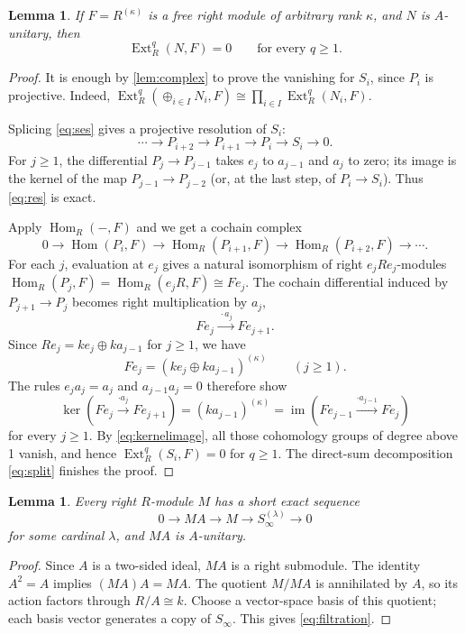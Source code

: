 \documentclass[11pt]{amsart}
\newtheorem{lemma}[theorem]{Lemma}
\theoremstyle{definition}
\theoremstyle{remark}
\newcommand{\Ext}{\operatorname{Ext}}
\newcommand{\Hom}{\operatorname{Hom}}
\begin{document}
\begin{lemma}\label{lem:Extvanish}
If $F=R^{(\kappa)}$ is a free right module of arbitrary rank $\kappa$, and $N$ is $A$-unitary, then
\begin{equation}\label{eq:Extvanish}
\Ext_R^q(N,F)=0\qquad\text{for every }q\geq1.
\end{equation}
\end{lemma}
\begin{proof}
It is enough by \cref{lem:complex} to prove the vanishing for $S_i$, since $P_i$ is projective. Indeed, $\Ext^q_R(\oplus_{i\in I}N_i,F)\cong\prod_{i\in I}\Ext_R^q(N_i,F)$.

Splicing \eqref{eq:ses} gives a projective resolution of $S_i$:
\begin{equation}\label{eq:res}
\cdots\longrightarrow P_{i+2}\longrightarrow P_{i+1}
\longrightarrow P_i\longrightarrow S_i\longrightarrow0.
\end{equation}
For $j\geq1$, the differential $P_j\to P_{j-1}$ takes $e_j$ to $a_{j-1}$ and $a_j$ to zero; its image is the kernel of the map $P_{j-1}\to P_{j-2}$ (or, at the last step, of $P_i\to S_i$). Thus \eqref{eq:res} is exact.

Apply $\Hom_R(-,F)$ and we get a cochain complex\[
0\longrightarrow \Hom(P_i,F)\longrightarrow\Hom_R(P_{i+1},F)\longrightarrow\Hom_R(P_{i+2},F)\longrightarrow\cdots.
\]
For each $j$, evaluation at $e_j$ gives a natural isomorphism of right $e_jRe_j$-modules $\Hom_R(P_j,F)=\Hom_R(e_jR,F)\cong Fe_j$. The cochain differential induced by $P_{j+1}\to P_j$ becomes right multiplication by $a_j$,
\[
Fe_j\xrightarrow{\,\cdot a_j\,}Fe_{j+1}.
\]
Since $Re_j=ke_j\oplus ka_{j-1}$ for $j\geq1$, we have
\[
Fe_j=(ke_j\oplus ka_{j-1})^{(\kappa)}\qquad(j\geq1).
\]
The rules $e_ja_j=a_j$ and $a_{j-1}a_j=0$ therefore show
\begin{equation}\label{eq:kernelimage}
\ker(Fe_j\xrightarrow{\cdot a_j}Fe_{j+1})
=(ka_{j-1})^{(\kappa)}
=\operatorname{im}(Fe_{j-1}\xrightarrow{\cdot a_{j-1}}Fe_j)
\end{equation}
for every $j\geq1$. By \eqref{eq:kernelimage}, all those cohomology groups of degree above 1 vanish, and hence $\Ext_R^q(S_i,F)=0$ for $q\geq1$. The direct-sum decomposition \eqref{eq:split} finishes the proof.
\end{proof}

\begin{lemma}\label{lem:filtration}
Every right $R$-module $M$ has a short exact sequence
\begin{equation}\label{eq:filtration}
0\longrightarrow MA\longrightarrow M\longrightarrow S_\infty^{(\lambda)}\longrightarrow0
\end{equation}
for some cardinal $\lambda$, and $MA$ is $A$-unitary.
\end{lemma}
\begin{proof}
Since $A$ is a two-sided ideal, $MA$ is a right submodule. The identity $A^2=A$ implies $(MA)A=MA$. The quotient $M/MA$ is annihilated by $A$, so its action factors through $R/A\cong k$. Choose a vector-space basis of this quotient; each basis vector generates a copy of $S_\infty$. This gives \eqref{eq:filtration}.
\end{proof}
\end{document}
